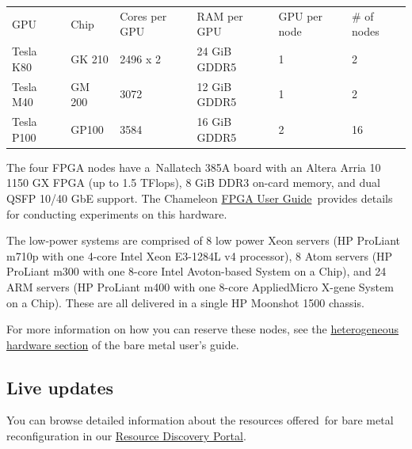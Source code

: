 \begin{longtable}[]{@{}llllll@{}}
\toprule
GPU & Chip & Cores per GPU & RAM per GPU & GPU per node & \# of
nodes\tabularnewline
Tesla K80 & GK 210 & 2496 x 2 & 24 GiB GDDR5 & 1 & 2\tabularnewline
Tesla M40 & GM 200 & 3072 & 12 GiB GDDR5 & 1 & 2\tabularnewline
Tesla P100 & GP100 & 3584 & 16 GiB GDDR5 & 2 & 16\tabularnewline
\bottomrule
\end{longtable}

The four FPGA nodes have a~Nallatech 385A board with an Altera Arria 10
1150 GX FPGA (up to 1.5 TFlops), 8 GiB DDR3 on-card memory, and dual
QSFP 10/40 GbE support. The Chameleon
\href{https://www.chameleoncloud.org/docs/bare-metal-user-guide/fpga/}{FPGA
User Guide}~provides details for conducting experiments on this
hardware.

The low-power systems are comprised of 8 low power Xeon servers (HP
ProLiant m710p with one 4-core Intel Xeon E3-1284L v4 processor), 8 Atom
servers (HP ProLiant m300 with one 8-core Intel Avoton-based System on a
Chip), and 24 ARM servers (HP ProLiant m400 with one 8-core AppliedMicro
X-gene System on a Chip). These are all delivered in a single HP
Moonshot 1500 chassis.

For more information on how you can reserve these nodes, see the
\href{https://www.chameleoncloud.org/docs/bare-metal-user-guide/\#heterogeneous_hardware}{heterogeneous
hardware section} of the bare metal user's guide.


\subsection{Live updates}
You can browse detailed information about the resources
offered~for bare metal reconfiguration in our
\href{https://www.chameleoncloud.org/user/discovery/}{Resource Discovery
Portal}.

